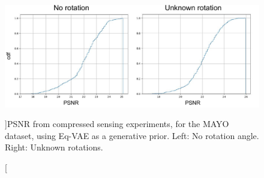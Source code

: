 \begin{figure}[ht!]
    \includegraphics[width=\textwidth]{pics/2_equiv_vae/eqvae_psnr.pdf}
    \caption[][\baselineskip]{PSNR from compressed sensing experiments, for the MAYO dataset, using Eq-VAE as a generative prior. Left: No rotation angle. Right: Unknown rotations.}
    \label{fig:mayo_psnr}
       \vspace*{\baselineskip}
\end{figure}
